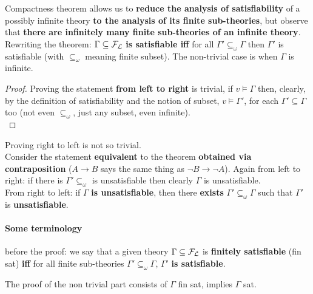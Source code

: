 	Compactness theorem allows us to \textbf{reduce the analysis of satisfiability} of a possibly infinite theory \textbf{to the analysis of its finite sub-theories}, but observe that \textbf{there are infinitely many finite sub-theories of an infinite theory}.\\

	Rewriting the theorem: $\Gamma \subseteq \mathcal{F}_\mathcal{L}$ \textbf{is satisfiable iff} for all $\Gamma' \subseteq_{\omega} \Gamma$ then $\Gamma'$ is satisfiable (with $\subseteq_{\omega}$ meaning finite subset). The non-trivial case is when $\Gamma$ is infinite.\\

	\begin{proof}
		Proving the statement \textbf{from left to right} is trivial, if $v \models \Gamma$ then, clearly, by the definition of satisfiability and the notion of subset, $v \models \Gamma'$, for each $\Gamma' \subseteq \Gamma$ too (not even $\subseteq_\omega$, just any subset, even infinite).\\
	\end{proof}
	Proving right to left is not so trivial.\\

	Consider the statement \textbf{equivalent} to the theorem \textbf{obtained via contraposition} ($A \rightarrow B$ says the same thing as $\neg B \rightarrow \neg A$). Again from left to right: if there is $\Gamma' \subseteq_\omega$ is unsatisfiable then clearly $\Gamma$ is unsatisfiable.\\

	From right to left: if $\Gamma$ \textbf{is unsatisfiable}, then there \textbf{exists} $\Gamma' \subseteq_\omega \Gamma$ such that $\Gamma'$ is \textbf{unsatisfiable}.\\

	\newpage

	\paragraph{Some terminology} before the proof: we say that a given theory $\Gamma \subseteq \mathcal{F}_\mathcal{L}$ is \textbf{finitely satisfiable} (fin sat) \textbf{iff} for all finite sub-theories $\Gamma' \subseteq_\omega \Gamma$, $\Gamma'$ \textbf{is satisfiable}.

	The proof of the non trivial part consists of $\Gamma$ fin sat, implies $\Gamma$ sat.\\


